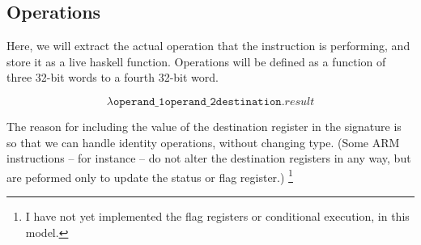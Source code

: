 \documentclass{article}
\begin{document}
\subsection{Operations}

Here, we will extract the actual operation that the instruction
is performing, and store it as a live haskell function.
Operations will be defined as a function of three 32-bit words
to a fourth 32-bit word.

$$ \lambda \texttt{operand_1} \texttt{operand_2} \texttt{destination} . \textit{result} $$

The reason for including the value of the destination register
in the signature is so that we can handle identity operations,
without changing type. (Some ARM instructions --  for
instance -- do not alter the destination registers in any way, but
are peformed only to update the status or flag register.) %
\footnote{I have not yet implemented the flag registers or
conditional execution, in this model.}
\end{document}
